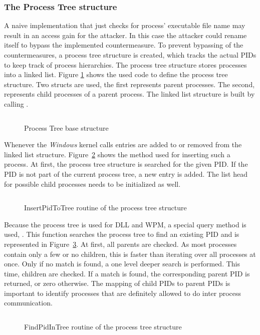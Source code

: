 \subsubsection{The Process Tree structure}
A naive implementation that just checks for process' executable file name may result in an access gain for the attacker. In this case the attacker could rename itself to bypass the implemented countermeasure. To prevent bypassing of the countermeasures, a process tree structure is created, which tracks the actual \glspl{PID} to keep track of process hierarchies. The process tree structure stores processes into a linked list. Figure \ref{code:code1} shows the used code to define the process tree structure. Two structs are used, the first  represents parent processes. The second,  represents child processes of a parent process. The linked list structure is built by calling  \cite{msdn_initlisthead}.
\begin{figure}[h]
\inputminted[breakanywhere, breaklines,fontsize=\scriptsize, frame=single, mathescape, linenos, numbersep=5pt, numbersep=5pt, xleftmargin=0pt]{c}{sections/implementation/code1.c}
\caption{Process Tree base structure}
\label{code:code1}
\end{figure}
Whenever the \emph{Windows} kernel calls  entries are added to or removed from the linked list structure. Figure~\ref{code:code2} shows the method used for inserting such a process. At first, the process tree structure is searched for the given \gls{PID}. If the \gls{PID} is not part of the current process tree, a new entry is added. The list head for possible child processes needs to be initialized as well.
\begin{figure}[h]
\inputminted[breakanywhere, breaklines,fontsize=\scriptsize, frame=single, mathescape, linenos, numbersep=5pt, numbersep=5pt, xleftmargin=0pt]{c}{sections/implementation/code2.c}
\caption{InsertPidToTree routine of the process tree structure}
\label{code:code2}
\end{figure}
Because the process tree is used for \gls{DLL} and \gls{WPM}, a special query method is used, . This function searches the process tree to find an existing \gls{PID} and is represented in Figure~\ref{code:code3}. At first, all parents are checked. As most processes contain only a few or no children, this is faster than iterating over all processes at once. Only if no match is found, a one level deeper search is performed. This time, children are checked. If a match is found, the corresponding parent \gls{PID} is returned, or zero otherwise. The mapping of child \glspl{PID} to parent \glspl{PID} is important to identify processes that are definitely allowed to do inter process communication.
\begin{figure}[h]
\inputminted[breakanywhere, breaklines,fontsize=\scriptsize, frame=single, mathescape, linenos, numbersep=5pt, numbersep=5pt, xleftmargin=0pt]{c}{sections/implementation/code3.c}
\caption{FindPidInTree routine of the process tree structure}
\label{code:code3}
\end{figure}

